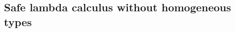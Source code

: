 \documentclass{article}
\begin{document}
\subsection{Safe lambda calculus without homogeneous types}

\end{document}
